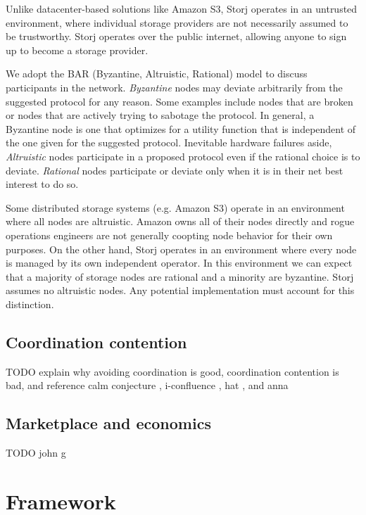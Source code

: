 \documentclass[a4paper,10pt]{article} \usepackage[utf8]{inputenc}
\newcommand{\todo}[1]{{\color{red} TODO #1 }}
\begin{document}
Unlike datacenter-based solutions like Amazon S3, Storj operates in an untrusted
environment, where individual storage providers are not necessarily assumed to be
trustworthy. Storj operates over the public internet, allowing anyone to sign
up to become a storage provider.

We adopt the BAR (Byzantine, Altruistic, Rational) model \cite{bar} to discuss
participants in the network.
{\em Byzantine} nodes may deviate arbitrarily from the suggested protocol for
any reason. Some examples include nodes that are broken or nodes that
are actively trying to sabotage the protocol. In general, a Byzantine node is
one that optimizes for a utility function that is independent of the one
given for the suggested protocol.
Inevitable hardware failures aside, {\em Altruistic} nodes
participate in a proposed protocol even if the rational choice is to deviate.
{\em Rational} nodes participate or deviate only when it
is in their net best interest to do so.

Some distributed storage systems (e.g. Amazon S3) operate in an environment
where all nodes are altruistic. Amazon owns all of their nodes directly and
rogue operations engineers are not generally coopting node behavior for their
own purposes.
On the other hand, Storj operates in an environment where every node is
managed by its own independent operator.
In this environment we can expect that a majority
of storage nodes are rational and a minority are byzantine. Storj assumes no
altruistic nodes. Any potential implementation must account for this distinction.

\subsection{Coordination contention}

\todo{explain why avoiding coordination is good, coordination contention
is bad, and reference calm conjecture
\cite{calm1, calm2}, i-confluence \cite{i-confluence}, hat \cite{hat}, and
anna \cite{anna}}

\subsection{Marketplace and economics}

\todo{john g}

\section{Framework}\label{sec:framework}
\end{document}
